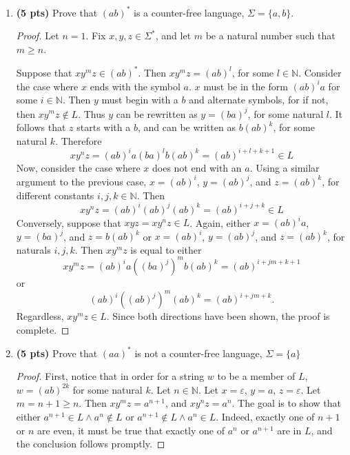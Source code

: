 \documentclass[11pt]{article}
\begin{document}
\begin{enumerate}[label=\textbf{Q\arabic*.}]
\begin{enumerate}[label=\textit{\alph*)}]
\begin{proof}
		Now, suppose that \(w \in \mathcal{L} (r)\). 
	\end{proof}

	\item \textbf{(5 pts)} Prove that $(ab)^*$ is a counter-free language,  $\Sigma = \{a,b\}$.
	
	\begin{proof}
		Let \(n = 1\). Fix \(x,y,z \in \Sigma ^*\), and let \(m\) be a natural number such that \(m \geq n\).

		Suppose that \(xy^m z \in (ab)^*\). Then \(xy^m z = (ab)^l\), for some \(l \in \mathbb{N}\). Consider the case where \(x\) ends with the symbol \(a\). \(x\) must be in the form \((ab)^i a\) for some \(i \in \mathbb{N}\). Then \(y\) must begin with a \(b\) and alternate symbols, for if not, then \(xy^m z \notin L\). Thus \(y\) can be rewritten as \(y = (ba)^j\), for some natural \(l\). It follows that \(z\) starts with a \(b\), and can be written as \(b(ab)^k\), for some natural \(k\). Therefore
		\[
			xy^n z = (ab)^i a (ba)^l b (ab)^k = (ab)^{i+l+k+1} \in L
		\]
		Now, consider the case where \(x\) does not end with an \(a\). Using a similar argument to the previous case, \(x = (ab)^i\), \(y = (ab)^j\), and \(z = (ab)^k\), for different constants \(i,j,k \in \mathbb{N}\). Then
		\[
			xy^n z = (ab)^i (ab)^j (ab)^k = (ab)^{i+j+k} \in L
		\]
		Conversely, suppose that \(xyz = xy^n z \in L\). Again, either \(x = (ab)^i a\), \(y = (ba)^j\), and \(z = b(ab)^k\) or \(x = (ab)^i\), \(y = (ab)^j\), and \(z = (ab)^k\), for naturals \(i,j,k\). Then \(xy^m z\) is equal to either
		\[
			xy^m z = (ab)^i a ((ba)^j)^m b(ab)^k = (ab)^{i+jm+k+1}
		\]
		or
		\[
			(ab)^i ((ab)^j)^m (ab)^k = (ab)^{i+jm+k} \text{.} 
		\]
		Regardless, \(xy^m z \in L\). Since both directions have been shown, the proof is complete.
		
	\end{proof}
	\item \textbf{(5 pts)} Prove that  $(aa)^*$ is not a counter-free language, $\Sigma = \{a\}$
	
	\begin{proof}
		First, notice that in order for a string \(w\) to be a member of \(L\), \(w = (ab)^{2k}\) for some natural \(k\). Let \(n \in \mathbb{N}\). Let \(x = \varepsilon\), \(y = a\), \(z = \varepsilon\). Let \(m = n + 1 \geq n\). Then \(xy^m z = a^{n+1} \), and \(xy^n z = a^n\). The goal is to show that either \(a^{n+1} \in L \land a^n \notin L\) or \(a^{n+1} \notin L \land a^n \in L\). Indeed, exactly one of \(n+1\) or \(n\) are even, it must be true that exactly one of \(a^n\) or \(a^{n+1}\) are in \(L\), and the conclusion follows promptly.


\end{proof}
\end{enumerate}
\end{enumerate}
\end{document}
